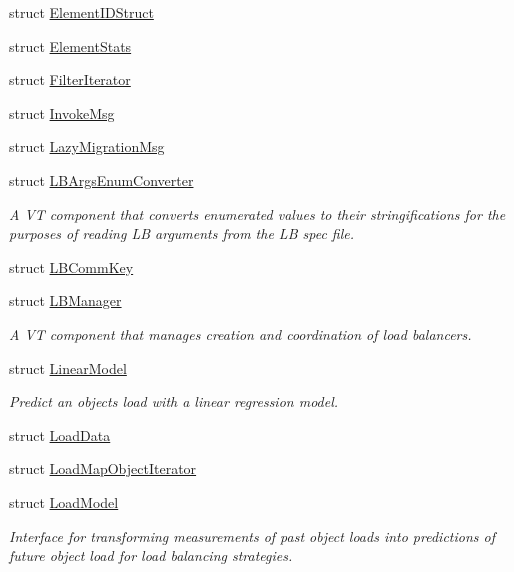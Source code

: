 \begin{DoxyCompactItemize}
\item 
struct \hyperlink{structvt_1_1vrt_1_1collection_1_1balance_1_1_element_i_d_struct}{Element\+I\+D\+Struct}
\item 
struct \hyperlink{structvt_1_1vrt_1_1collection_1_1balance_1_1_element_stats}{Element\+Stats}
\item 
struct \hyperlink{structvt_1_1vrt_1_1collection_1_1balance_1_1_filter_iterator}{Filter\+Iterator}
\item 
struct \hyperlink{structvt_1_1vrt_1_1collection_1_1balance_1_1_invoke_msg}{Invoke\+Msg}
\item 
struct \hyperlink{structvt_1_1vrt_1_1collection_1_1balance_1_1_lazy_migration_msg}{Lazy\+Migration\+Msg}
\item 
struct \hyperlink{structvt_1_1vrt_1_1collection_1_1balance_1_1_l_b_args_enum_converter}{L\+B\+Args\+Enum\+Converter}
\begin{DoxyCompactList}\small\item\em A VT component that converts enumerated values to their stringifications for the purposes of reading LB arguments from the LB spec file. \end{DoxyCompactList}\item 
struct \hyperlink{structvt_1_1vrt_1_1collection_1_1balance_1_1_l_b_comm_key}{L\+B\+Comm\+Key}
\item 
struct \hyperlink{structvt_1_1vrt_1_1collection_1_1balance_1_1_l_b_manager}{L\+B\+Manager}
\begin{DoxyCompactList}\small\item\em A VT component that manages creation and coordination of load balancers. \end{DoxyCompactList}\item 
struct \hyperlink{structvt_1_1vrt_1_1collection_1_1balance_1_1_linear_model}{Linear\+Model}
\begin{DoxyCompactList}\small\item\em Predict an object\textquotesingle{}s load with a linear regression model. \end{DoxyCompactList}\item 
struct \hyperlink{structvt_1_1vrt_1_1collection_1_1balance_1_1_load_data}{Load\+Data}
\item 
struct \hyperlink{structvt_1_1vrt_1_1collection_1_1balance_1_1_load_map_object_iterator}{Load\+Map\+Object\+Iterator}
\item 
struct \hyperlink{structvt_1_1vrt_1_1collection_1_1balance_1_1_load_model}{Load\+Model}
\begin{DoxyCompactList}\small\item\em Interface for transforming measurements of past object loads into predictions of future object load for load balancing strategies. \end{DoxyCompactList}\item 

\end{DoxyCompactItemize}

